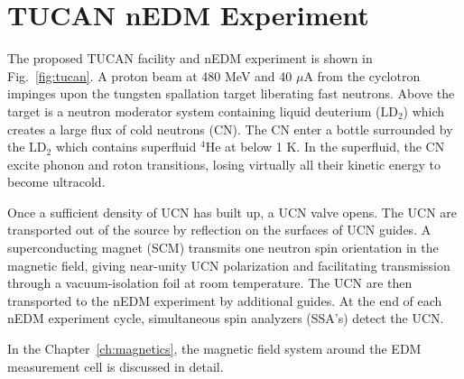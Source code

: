 \section{TUCAN nEDM Experiment}



The proposed TUCAN facility and nEDM experiment is shown in Fig.~\ref{fig:tucan}. A proton beam at 480 MeV and 40 $\mu$A from the cyclotron impinges upon the tungsten spallation target liberating fast neutrons. Above the target is a neutron moderator system containing liquid deuterium ($\mathrm{LD_2}$) which creates a large flux of cold neutrons (CN). The CN enter a bottle surrounded by the $\mathrm{LD_2}$ which contains superfluid $^4\mathrm{He}$ at below 1 K. In the superfluid, the CN excite phonon and roton transitions, losing virtually all their kinetic energy to become ultracold. 

Once a sufficient density of UCN has built up, a UCN valve opens. The UCN are transported out of the source by reflection on the surfaces of UCN guides. A superconducting magnet (SCM) transmits one neutron spin orientation in the magnetic field, giving near-unity UCN polarization and facilitating transmission through a vacuum-isolation foil at room temperature. The UCN are then transported to the nEDM experiment by additional guides. At the end of each nEDM experiment cycle, simultaneous spin analyzers (SSA's) detect the UCN.


In the Chapter~\ref{ch:magnetics}, the magnetic field system around the EDM measurement cell is discussed in detail.








